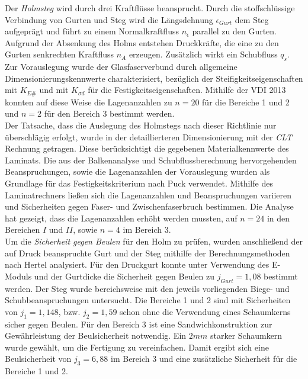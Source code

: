\noindent Der \textit{Holmsteg} wird durch drei Kraftflüsse beansprucht. Durch die stoffschlüssige Verbindung von Gurten und Steg wird die Längsdehnung $ \epsilon_{Gurt} $ dem Steg aufgeprägt und führt zu einem Normalkraftfluss $ n_{\epsilon} $ parallel zu den Gurten. Aufgrund der Absenkung des Holms entstehen Druckkräfte, die eine zu den Gurten senkrechten Kraftfluss $ n_{A} $ erzeugen. Zusätzlich wirkt ein Schubfluss $ q_{s} $. Zur Vorauslegung wurde der Glasfaserverbund durch allgemeine Dimensionierungskennwerte charakterisiert, bezüglich der Steifigkeitseigenschaften mit $ K_{E\#} $ und mit $ K_{\sigma d} $ für die Festigkeitseigenschaften. Mithilfe der VDI 2013 konnten auf diese Weise die Lagenanzahlen zu $ n=20 $ für die Bereiche 1 und 2 und $ n=2 $ für den Bereich 3 bestimmt werden.\\

\noindent Der Tatsache, dass die Auslegung des Holmstegs nach dieser Richtlinie nur überschlägig erfolgt, wurde in der detaillierteren Dimensionierung mit der \textit{CLT} Rechnung getragen. Diese berücksichtigt die gegebenen Materialkennwerte des Laminats. Die aus der Balkenanalyse und Schubflussberechnung hervorgehenden Beanspruchungen, sowie die Lagenanzahlen der Vorauslegung wurden als Grundlage für das Festigkeitskriterium nach Puck verwendet. Mithilfe des Laminatrechners ließen sich die Lagenanzahlen und Beanspruchungen variieren und Sicherheiten gegen Faser- und Zwischenfaserbruch bestimmen. Die Analyse hat gezeigt, dass die Lagenanzahlen erhöht werden mussten, auf $ n=24 $ in den Bereichen $I$ und $II$, sowie $ n=4 $ im Bereich 3.\\

\noindent Um die \textit{Sicherheit gegen Beulen} für den Holm zu prüfen, wurden anschließend der auf Druck beanspruchte Gurt und der Steg mithilfe der Berechnungsmethoden nach Hertel analysiert. Für den Druckgurt konnte unter Verwendung des E-Moduls und der Gurtdicke die Sicherheit gegen Beulen zu $ j_{Gurt}=1,08 $ bestimmt werden. Der Steg wurde bereichsweise mit den jeweils vorliegenden Biege- und Schubbeanspruchungen untersucht. Die Bereiche 1 und 2 sind mit Sicherheiten von $ j_{1}=1,148 $, bzw. $ j_{2}=1,59 $ schon ohne die Verwendung eines Schaumkerns sicher gegen Beulen. Für den Bereich 3 ist eine Sandwichkonstruktion zur Gewährleistung der Beulsicherheit notwendig. Ein $ 2mm $ starker Schaumkern wurde gewählt, um die Fertigung zu vereinfachen. Damit ergibt sich eine Beulsicherheit von $ j_{3}=6,88 $ im Bereich 3 und eine zusätzliche Sicherheit für die Bereiche 1 und 2.\\

